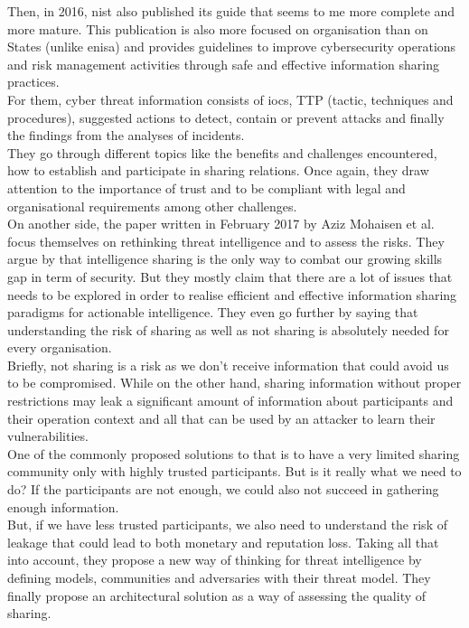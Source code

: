 \documentclass{eplmastersthesis}
\begin{document}
Then, in 2016, \gls{nist} also published its guide \cite{johnson2014guide} that seems to me more complete and more mature. This publication is also more focused on organisation than on States (unlike \gls{enisa}) and provides guidelines to improve cybersecurity operations and risk management activities through safe and effective information sharing practices.\\
For them, cyber threat information consists of \gls{ioc}s, TTP (tactic, techniques and procedures), suggested actions to detect, contain or prevent attacks and finally the findings from the analyses of incidents. \\
They go through different topics like the benefits and challenges encountered, how to establish and participate in sharing relations. Once again, they draw attention to the importance of trust and to be compliant with legal and organisational requirements among other challenges.\\

On another side, the paper written in February 2017 by Aziz Mohaisen et al. \cite{mohaisen2017rethinking} focus themselves on rethinking threat intelligence and to assess the risks. They argue by \cite{MalikThreat} that intelligence sharing is the only way to combat our growing skills gap in term of security. But they mostly claim that there are a lot of issues that needs to be explored in order to realise efficient and effective information sharing paradigms for actionable intelligence. They even go further by saying that understanding the risk of sharing as well as not sharing is absolutely needed for every organisation.\\
Briefly, not sharing is a risk as we don't receive information that could avoid us to be compromised. While on the other hand, sharing information without proper restrictions may leak a significant amount of information about participants and their operation context and all that can be used by an attacker to learn their vulnerabilities.\\
One of the commonly proposed solutions to that is to have a very limited sharing community only with highly trusted participants. But is it really what we need to do? If the participants are not enough, we could also not succeed in gathering enough information.\\
But, if we have less trusted participants, we also need to understand the risk of leakage that could lead to both monetary and reputation loss. Taking all that into account, they propose a new way of thinking for threat intelligence by defining models, communities and adversaries with their threat model.
They finally propose an architectural solution as a way of assessing the quality of sharing.
\end{document}
